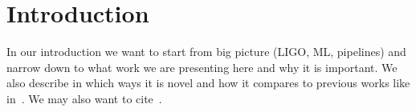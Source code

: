\section{Introduction}
In our introduction we want to start from big picture (LIGO, ML, pipelines)
and narrow down to what work we are presenting here and why it is important. We
also describe in which ways it is novel and how it compares to previous works
like in~\cite{Chatterjee:2019avs}. We may also want to cite~\cite{Sachdev:2020lfd}. 